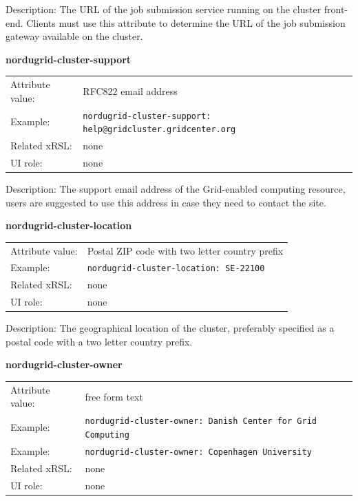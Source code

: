 \documentclass{article}
\begin{document}
Description: The URL of the job submission service running on the cluster front-end.
Clients must use this attribute to determine the URL of the job submission gateway
available on the cluster.


  \hspace*{0.5cm}
  \begin{shaded}
    \textbf{nordugrid-cluster-support}
  \end{shaded}
  \begin{tabular}{lp{10cm}}  
    Attribute value:& RFC822 email address\\
    Example:& \verb#nordugrid-cluster-support: help@gridcluster.gridcenter.org#\\
    Related xRSL:& none\\
    UI role:& none \\
  \end{tabular}

Description: The support email address of the Grid-enabled computing resource,
users are suggested to use this address in case they need to contact the site.


  \hspace*{0.5cm}
  \begin{shaded}
    \textbf{nordugrid-cluster-location}
  \end{shaded}
  \begin{tabular}{lp{10cm}}  
    Attribute value:& Postal ZIP code with two letter country prefix\\
    Example:& \verb#nordugrid-cluster-location: SE-22100#\\
    Related xRSL:& none\\
    UI role:& none\\
  \end{tabular}

Description: The geographical location of the cluster, preferably
specified as a postal code with a two letter country prefix.


  \hspace*{0.5cm}
  \begin{shaded}
    \textbf{nordugrid-cluster-owner}
  \end{shaded}
  \begin{tabular}{lp{10cm}}  
    Attribute value:& free form text\\
    Example:& \verb#nordugrid-cluster-owner: Danish Center for Grid Computing#\\
    Example:& \verb#nordugrid-cluster-owner: Copenhagen University#\\
    Related xRSL:& none\\
    UI role:& none\\
  \end{tabular}
\end{document}
